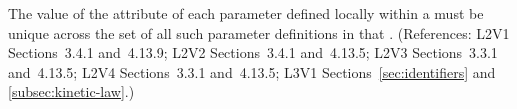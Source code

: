 The value of the  attribute of each parameter defined locally within
a \KineticLaw must be unique across the set of all such parameter
definitions in that \KineticLaw.  (References: L2V1 Sections~3.4.1 and~4.13.9;
L2V2 Sections~3.4.1 and~4.13.5; L2V3 Sections~3.3.1 and~4.13.5;
L2V4 Sections~3.3.1 and~4.13.5; L3V1 Sections~\ref{sec:identifiers} 
and \ref{subsec:kinetic-law}.)
